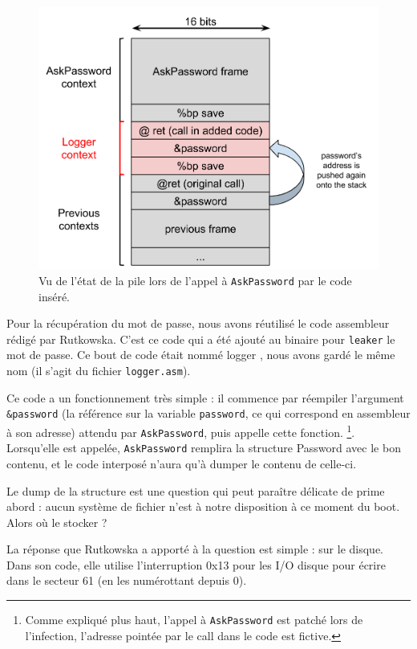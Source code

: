 \documentclass[12pt,a4paper]{article}
\begin{document}
\begin{figure}
    \centering
    \includegraphics[height=0.3\textheight]{img/pile_tc.png}
    \caption{Vu de l'état de la pile lors de l'appel à \texttt{AskPassword} par
             le code inséré.}
    \label{ask_tweak}
\end{figure}

Pour la récupération du mot de passe, nous avons réutilisé le code assembleur
rédigé par Rutkowska. C'est ce code qui a été ajouté au binaire pour
\texttt{leaker} le mot de passe. Ce bout de code était nommé \og logger \fg, nous
avons gardé le même nom (il s'agit du fichier \texttt{logger.asm}).

Ce code a un fonctionnement très simple : il commence par réempiler l'argument
\texttt{\&password} (la référence sur la variable \texttt{password}, ce qui
correspond en assembleur à son adresse) attendu par \texttt{AskPassword}, puis
appelle cette fonction.  \footnote{Comme expliqué plus haut, l'appel à
\texttt{AskPassword} est patché lors de l'infection, l'adresse pointée par le
call dans le code est fictive.}. Lorsqu'elle est appelée, \texttt{AskPassword}
remplira la structure Password avec le bon contenu, et le code interposé n'aura 
qu'à dumper le contenu de celle-ci.

Le dump de la structure est une question qui peut paraître délicate de prime
abord : aucun système de fichier n'est à notre disposition à ce moment du boot.
Alors où le stocker ?

La réponse que Rutkowska a apporté à la question est simple : sur le disque.
Dans son code, elle utilise l'interruption 0x13 pour les I/O disque pour écrire
dans le secteur 61 (en les numérottant depuis 0).
\end{document}
